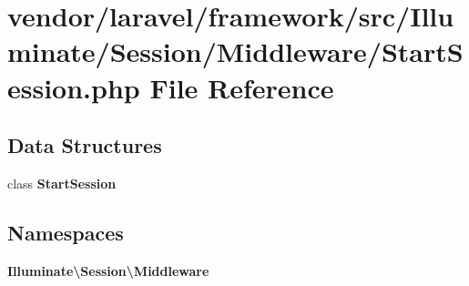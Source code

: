 \section{vendor/laravel/framework/src/\+Illuminate/\+Session/\+Middleware/\+Start\+Session.php File Reference}
\label{_start_session_8php}
\subsection*{Data Structures}
\begin{DoxyCompactItemize}
\item 
class {\bf Start\+Session}
\end{DoxyCompactItemize}
\subsection*{Namespaces}
\begin{DoxyCompactItemize}
\item 
 {\bf Illuminate\textbackslash{}\+Session\textbackslash{}\+Middleware}
\end{DoxyCompactItemize}
